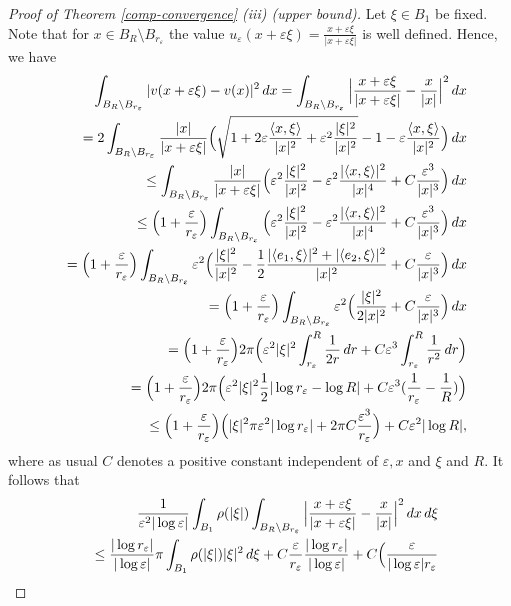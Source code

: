 \documentclass[11pt]{article}
\def\e{\varepsilon}
\begin{document}
\begin{proof}[Proof of Theorem {\rm\ref{comp-convergence}} {\rm (iii)} (upper bound)]
Let $\xi\in B_1$ be fixed. Note that for $x\in B_{R}\setminus B_{r_\e}$ the value $u_\e(x+\e\xi)=\frac{x+\e\xi}{|x+\e\xi|}$ is well defined. 
Hence, we have 
\begin{eqnarray*}
&&\hspace{-1cm}\int_{B_{R}\setminus B_{r_\e}} | v(x+\e \xi)-v(x)|^2\, dx=\int_{B_{R}\setminus B_{r_\e}} \Big| \frac{x+\e \xi}{|x+\e \xi|}-\frac{x}{|x|} \Big|^2\, dx \\
&&= 2\int_{B_{R}\setminus B_{r_\e}} 
\frac{|x|}{|x+\e\xi|}\Big(\sqrt{1+2\e \frac{\langle x,\xi\rangle}{|x|^2}+\e^2\frac{|\xi|^2}{|x|^2}}- 1 -\e \frac{\langle x,\xi\rangle}{|x|^2}\Big)\, dx\\
&&\leq \int_{B_{R}\setminus B_{r_\e}} 
\frac{|x|}{|x+\e\xi|}\Big(
\e^2\frac{|\xi|^2}{|x|^2}-\e^2 \frac{|\langle x,\xi\rangle|^2}{|x|^4}+C\frac{\e^3}{|x|^3}\Big)\, dx\\
&&\leq\Big(1+\frac{\e}{r_\e}\Big) \int_{B_{R}\setminus B_{r_\e}} 
\Big(
\e^2\frac{|\xi|^2}{|x|^2}-\e^2 \frac{|\langle x,\xi\rangle|^2}{|x|^4}+C\frac{\e^3}{|x|^3}\Big)\, dx\\
&&=\Big(1+\frac{\e}{r_\e}\Big) \int_{B_{R}\setminus B_{r_\e}} 
\e^2\Big(
\frac{|\xi|^2}{|x|^2}-\frac{1}{2} \frac{|\langle e_1,\xi\rangle|^2+|\langle e_2,\xi\rangle|^2}{|x|^2}+C\frac{\e}{|x|^3}\Big)\, dx\\
&&=\Big(1+\frac{\e}{r_\e}\Big) \int_{B_{R}\setminus B_{r_\e}} 
\e^2\Big(
\frac{|\xi|^2}{2|x|^2}+C\frac{\e}{|x|^3}\Big)\, dx\\
&&=\Big(1+\frac{\e}{r_\e}\Big)2\pi\Big(\e^2|\xi|^2\int_{r_\e}^{R} \frac{1}{2r}\, dr +C\e^3 \int_{r_\e}^{R} \frac{1}{r^2}\, dr\Big)\\
&&=\Big(1+\frac{\e}{r_\e}\Big)2\pi\Big(\e^2|\xi|^2 \frac{1}{2}|\log r_\e-\log R| +C\e^3 (\frac{1}{r_\e}-\frac{1}{R})\Big)\\
&&\leq\Big(1+\frac{\e}{r_\e}\Big)\Big(|\xi|^2 \pi \e^2|\log r_\e| +2\pi C  \frac{\e^3}{r_\e}\Big)+ C\e^2|\log R|,  
\end{eqnarray*}
where as usual $C$ denotes a positive constant independent of $\e, x$ and $\xi$ and $R$.  
It follows that
\begin{eqnarray*}
&&\hspace{-1cm}\frac{1}{\e^2|\log\e|}\int_{B_1}\rho(|\xi|)\int_{B_{R}\setminus B_{r_\e}} \Big| \frac{x+\e \xi}{|x+\e \xi|}-\frac{x}{|x|} \Big|^2\, dx\, d\xi \\
&&\leq 
\frac{|\log r_\e|}{|\log\e|}\pi \int_{B_1}\rho(|\xi|)|\xi|^2\, d\xi  + C
\frac{\e}{r_\e}\frac{|\log r_\e|}{|\log\e|} 
+ 
C \Big(\frac{\e}{|\log\e|r_\e}

\end{eqnarray*}
\end{proof}
\end{document}
